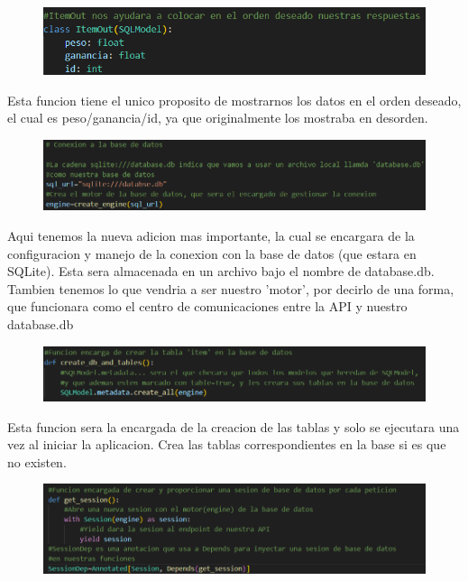 \documentclass[12pt]{article}
\begin{document}
\begin{figure}[H]
    \centering
    \includegraphics[width=1\textwidth]{Imagenes/Imagen WEB 3_3.png}
\end{figure}

Esta funcion tiene el unico proposito de mostrarnos los datos en el orden deseado, el cual es peso/ganancia/id, ya que originalmente los mostraba en desorden.

\begin{figure}[h!]
    \centering
    \includegraphics[width=1\textwidth]{Imagenes/Imagen WEB 3_4.png}
\end{figure}

Aqui tenemos la nueva adicion mas importante, la cual se encargara de la configuracion y manejo de la conexion con la base de datos (que estara en SQLite).
Esta sera almacenada en un archivo bajo el nombre de database.db.
Tambien tenemos lo que vendria a ser nuestro 'motor', por decirlo de una forma, que funcionara como el centro de comunicaciones entre la API y nuestro database.db

\begin{figure}[h!]
    \centering
    \includegraphics[width=1\textwidth]{Imagenes/Imagen WEB 3_5.png}
\end{figure}

Esta funcion sera la encargada de la creacion de las tablas y solo se ejecutara una vez al iniciar la aplicacion.
Crea las tablas correspondientes en la base si es que no existen.

\begin{figure}[H]
    \centering
    \includegraphics[width=1\textwidth]{Imagenes/Imagen WEB 3_6.png}
\end{figure}
\end{document}
